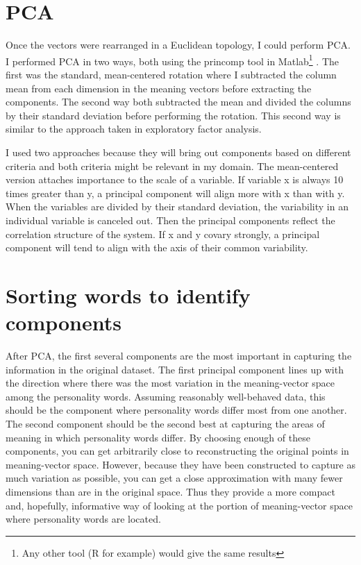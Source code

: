 \section{PCA}

Once the vectors were rearranged in a Euclidean topology, I could perform PCA. I 
performed PCA in two ways, both using the princomp tool in Matlab\footnote{Any 
other tool (R for example) would give the same results} \citep{Matlab2012a}. The 
first was the standard, mean-centered rotation where I subtracted the column 
mean from each dimension in the meaning vectors before extracting the 
components. The second way both subtracted the mean and divided the columns by 
their standard deviation before performing the rotation. This second way is 
similar to the approach taken in exploratory factor analysis. 

I used two approaches because they will bring out components based on different 
criteria and both criteria might be relevant in my domain. The mean-centered 
version attaches importance to the scale of a variable. If variable x is always 
10 times greater than y, a principal component will align more with x than with 
y. When the variables are divided by their standard 
deviation, the variability in an individual variable is canceled out. Then the 
principal components reflect the correlation structure of the system. If x and y 
covary strongly, a principal component will tend to align with the axis of their 
common variability.

\section{Sorting words to identify components}

After PCA, the first several components are the most important in capturing the 
information in the original dataset. The first principal component lines up with 
the direction where there was the most variation in the meaning-vector space 
among the personality words. Assuming reasonably well-behaved data, this should 
be the component where personality words differ most from one another. The 
second component should be the second best at capturing the areas of meaning in
which personality words differ. By choosing enough of these components, you can
get arbitrarily close to reconstructing the original points in meaning-vector 
space. However, because they have been constructed to capture as much variation
as possible, you can get a close approximation with many fewer dimensions than
are in the original space. Thus they provide a more compact and, hopefully, 
informative way of looking at the portion of meaning-vector space where 
personality words are located.

